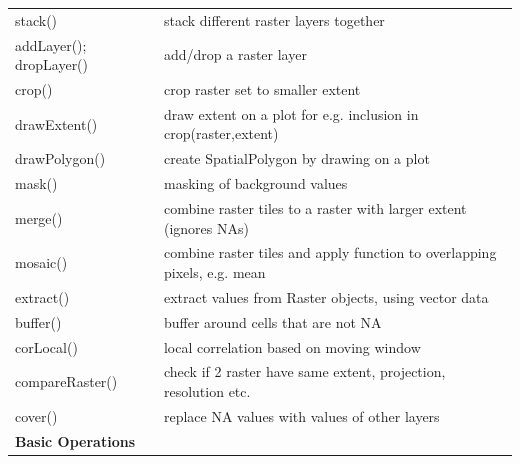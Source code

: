 \documentclass[10pt,landscape]{article}
\begin{document}
\begin{multicols}{3}
\begin{tabular}{@{}p{\the\MyLen}%
                @{}p{\linewidth-\the\MyLen}@{}}
stack() & stack different raster layers together \\
addLayer(); dropLayer()	& add/drop a raster layer\\
crop() 		& crop raster set to smaller extent  \\
drawExtent()	& draw extent on a plot for e.g. inclusion in crop(raster,extent)\\
drawPolygon()	& create SpatialPolygon by drawing on a plot\\
mask() 		& masking of background values \\
merge() & combine raster tiles to a raster with larger extent (ignores NAs)\\
mosaic() & combine raster tiles  and apply function to overlapping pixels, e.g. mean\\
extract() 	& extract values from Raster objects, using vector data  \\
buffer()	& buffer around cells that are not NA	\\
corLocal()	& local correlation based on moving window\\
compareRaster()	& check if 2 raster have same extent, projection, resolution etc.\\
cover()		&replace NA values with values of other layers\\

\bigskip

\textbf{Basic Operations} & \\


\end{tabular}
\end{multicols}
\end{document}
